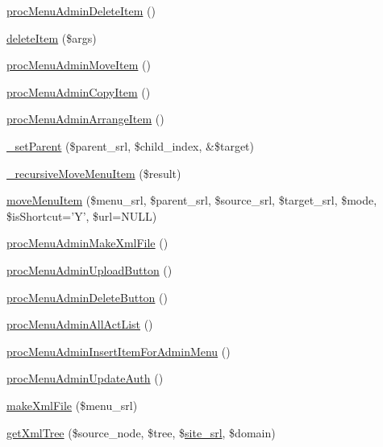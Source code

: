 \begin{DoxyCompactItemize}
\item 
\hyperlink{classmenuAdminController_a95f3b583f04dcd805696f7fd33b13d9c}{proc\-Menu\-Admin\-Delete\-Item} ()
\item 
\hyperlink{classmenuAdminController_a0a1051857eeec06de37b3d09729bd816}{delete\-Item} (\$args)
\item 
\hyperlink{classmenuAdminController_a4b1060e3cfddcffae2881a2981660b8b}{proc\-Menu\-Admin\-Move\-Item} ()
\item 
\hyperlink{classmenuAdminController_a57e5d3ee6747a38fd87eae506238e17f}{proc\-Menu\-Admin\-Copy\-Item} ()
\item 
\hyperlink{classmenuAdminController_ac803e1a5fb5bf35e30f20d727afb89dd}{proc\-Menu\-Admin\-Arrange\-Item} ()
\item 
\hyperlink{classmenuAdminController_a0eee3e8dfe3a4f9af9bd76f4776951cb}{\-\_\-set\-Parent} (\$parent\-\_\-srl, \$child\-\_\-index, \&\$target)
\item 
\hyperlink{classmenuAdminController_a663ff3838dde914ecaa1cd2875ce6848}{\-\_\-recursive\-Move\-Menu\-Item} (\$result)
\item 
\hyperlink{classmenuAdminController_af8dacd19919e854dbe083b602ea0f183}{move\-Menu\-Item} (\$menu\-\_\-srl, \$parent\-\_\-srl, \$source\-\_\-srl, \$target\-\_\-srl, \$mode, \$is\-Shortcut='Y', \$url=N\-U\-L\-L)
\item 
\hyperlink{classmenuAdminController_a8808afabf9eee859aca4150fc5d23051}{proc\-Menu\-Admin\-Make\-Xml\-File} ()
\item 
\hyperlink{classmenuAdminController_aa5f219cd08b79ff43eef69c89e7a9fd5}{proc\-Menu\-Admin\-Upload\-Button} ()
\item 
\hyperlink{classmenuAdminController_a8af649b53b356cc3b359253acd2183a2}{proc\-Menu\-Admin\-Delete\-Button} ()
\item 
\hyperlink{classmenuAdminController_a9a08d8c529270973c2dab9d62846b3b9}{proc\-Menu\-Admin\-All\-Act\-List} ()
\item 
\hyperlink{classmenuAdminController_a788f347d7232e73062a39785960a4f14}{proc\-Menu\-Admin\-Insert\-Item\-For\-Admin\-Menu} ()
\item 
\hyperlink{classmenuAdminController_aa7ae548464c3919b04a2153b6f9f2459}{proc\-Menu\-Admin\-Update\-Auth} ()
\item 
\hyperlink{classmenuAdminController_a1635d4c0dc3ace9e475422f9280e615e}{make\-Xml\-File} (\$menu\-\_\-srl)
\item 
\hyperlink{classmenuAdminController_ae924a4c2ac50c955e01e9c234d93c767}{get\-Xml\-Tree} (\$source\-\_\-node, \$tree, \$\hyperlink{ko_8install_8php_a8b1406b4ad1048041558dce6bfe89004}{site\-\_\-srl}, \$domain)

\end{DoxyCompactItemize}

